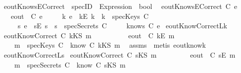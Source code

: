 \begin{isabellebody}
\isanewline
{}\isamarkupfalse \ eoutKnowsECorrect\ {\isacharcolon}{\isacharcolon}\ {\isachardoublequoteopen}specID\ {\isasymRightarrow}\ Expression\ {\isasymRightarrow}\ bool{\isachardoublequoteclose}\isanewline
{}\isanewline
\ \ {\isachardoublequoteopen}eoutKnowsECorrect\ C\ e\ {\isasymequiv}\isanewline
\ \ \ {\isacharparenleft}{\isacharparenleft}eout\ \ C\ e{\isacharparenright}\ {\isasymlongleftrightarrow}\isanewline
\ \ \ {\isacharparenleft}{\isacharparenleft}{\isasymexists}\ k{\isachardot}\ e\ {\isacharequal}\ {\isacharparenleft}kE\ k{\isacharparenright}\ {\isasymand}\ {\isacharparenleft}k\ {\isasymin}\ specKeys\ C{\isacharparenright}{\isacharparenright}\ {\isasymor}\ \isanewline
\ \ \ \ {\isacharparenleft}{\isasymexists}\ s{\isachardot}\ e\ {\isacharequal}\ {\isacharparenleft}sE\ s{\isacharparenright}\ {\isasymand}\ {\isacharparenleft}s\ {\isasymin}\ specSecrets\ C{\isacharparenright}{\isacharparenright}\ {\isasymor}\isanewline
\ \ \ \ {\isacharparenleft}knows\ C\ {\isacharbrackleft}e{\isacharbrackright}{\isacharparenright}{\isacharparenright}{\isacharparenright}{\isachardoublequoteclose}\isanewline
\isanewline
{}\isamarkupfalse \ eoutKnowCorrect{\isacharunderscore}L{}k{\isacharcolon}\isanewline
{}\ {\isachardoublequoteopen}eoutKnowCorrect\ C\ {\isacharparenleft}kKS\ m{\isacharparenright}{\isachardoublequoteclose}\ \ \isanewline
\ \ \ \ \ \ \ \ {\isachardoublequoteopen}eout\ \ C\ {\isacharparenleft}kE\ m{\isacharparenright}{\isachardoublequoteclose}\isanewline
{}\ \ \ \ {\isachardoublequoteopen}m\ {\isasymin}\ {\isacharparenleft}specKeys\ C{\isacharparenright}\ {\isasymor}\ {\isacharparenleft}know\ C\ {\isacharparenleft}kKS\ m{\isacharparenright}{\isacharparenright}{\isachardoublequoteclose}\ \isanewline
\isadelimproof
\endisadelimproof
\isatagproof
{}\isamarkupfalse \ assms\ \isamarkupfalse \ {\isacharparenleft}metis\ eout{\isacharunderscore}know{\isacharunderscore}k{\isacharparenright}\endisatagproof
{\isafoldproof}\isadelimproof
\isanewline
\endisadelimproof
\isanewline
{}\isamarkupfalse \ eoutKnowCorrect{\isacharunderscore}L{}s{\isacharcolon}\isanewline
{}\ {\isachardoublequoteopen}eoutKnowCorrect\ C\ {\isacharparenleft}sKS\ m{\isacharparenright}{\isachardoublequoteclose}\ \isanewline
\ \ \ \ \ \ \ \ {\isachardoublequoteopen}eout\ \ C\ {\isacharparenleft}sE\ m{\isacharparenright}{\isachardoublequoteclose}\isanewline
{}\ \ \ \ {\isachardoublequoteopen}m\ {\isasymin}\ {\isacharparenleft}specSecrets\ C{\isacharparenright}\ {\isasymor}\ {\isacharparenleft}know\ C\ {\isacharparenleft}sKS\ m{\isacharparenright}{\isacharparenright}{\isachardoublequoteclose}\ \isanewline

\end{isabellebody}
